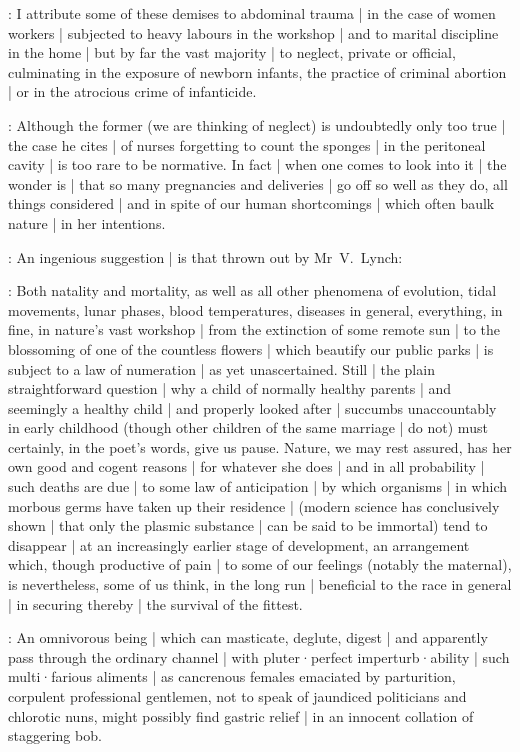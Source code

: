 \crotthers:
I attribute some of these demises to abdominal trauma |
in the case of women workers |
subjected to heavy labours in the workshop |
and to marital discipline in the home |
but by far the vast majority |
to neglect,
private or official,
culminating in the exposure of newborn infants,
the practice of criminal abortion |
or in the atrocious crime of infanticide.

:
Although the former
(we are thinking of neglect)
is undoubtedly only too true |
the case he cites |
of nurses forgetting to count the sponges |
in the peritoneal cavity |
is too rare to be normative.
In fact |
when one comes to look into it |
the wonder is |
that so many pregnancies and deliveries |
go off so well as they do,
all things considered |
and in spite of our human shortcomings |
which often baulk nature |
in her intentions.

:
An ingenious suggestion |
is that thrown out by Mr~V.~Lynch:

\lynch:
Both natality and mortality,
as well as all other phenomena of evolution,
tidal movements,
lunar phases,
blood temperatures,
diseases in general,
everything,
in fine,
in nature's vast workshop |
from the extinction of some remote sun |
to the blossoming of one of the countless flowers |
which beautify our public parks |
is subject to a law of numeration |
as yet unascertained.
Still |
the plain straightforward question |
why a child of normally healthy parents |
and seemingly a healthy child |
and properly looked after |
succumbs unaccountably in early childhood
(though other children of the same marriage |
do not)
must certainly,
in the poet's words,
give us pause.
Nature,
we may rest assured,
has her own good and cogent reasons |
for whatever she does |
and in all probability |
such deaths are due |
to some law of anticipation |
by which organisms |
in which morbous germs have taken up their residence |
(modern science has conclusively shown |
that only the plasmic substance |
can be said to be immortal)
tend to disappear |
at an increasingly earlier stage of development,
an arrangement which,
though productive of pain |
to some of our feelings
(notably the maternal),
is nevertheless,
some of us think,
in the long run |
beneficial to the race in general |
in securing thereby |
the survival of the fittest.

\stephen:
An omnivorous being |
which can masticate,
deglute,
digest |
and apparently pass through the ordinary channel |
with pluter·perfect imperturb·ability |
such multi·farious aliments |
as cancrenous females emaciated by parturition,
corpulent professional gentlemen,
not to speak of jaundiced politicians and chlorotic nuns,
might possibly find gastric relief |
in an innocent collation of staggering bob.

